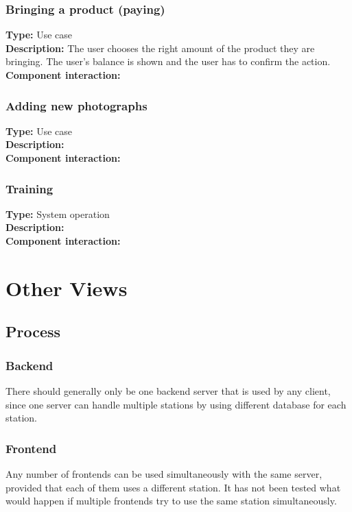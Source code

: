 \documentclass[11pt]{article}
\begin{document}
\subsubsection{Bringing a product (paying)}
\textbf{Type:} Use case\\
\textbf{Description:} The user chooses the right amount of the product they are bringing. The user's balance is shown and the user has to confirm the action.\\
\textbf{Component interaction:}\\

\subsubsection{Adding new photographs}
\textbf{Type:} Use case\\
\textbf{Description:}\\
\textbf{Component interaction:} \\

\subsubsection{Training}
\textbf{Type:} System operation\\
\textbf{Description:}\\
\textbf{Component interaction:}\\

\section{Other Views}


\subsection{Process}
\subsubsection{Backend}
There should generally only be one backend server that is used by any
client, since one server can handle multiple stations by using
different database for each station.

\subsubsection{Frontend}
Any number of frontends can be used simultaneously with the same
server, provided that each of them uses a different station. It has
not been tested what would happen if multiple frontends try to use the
same station simultaneously.
\end{document}
